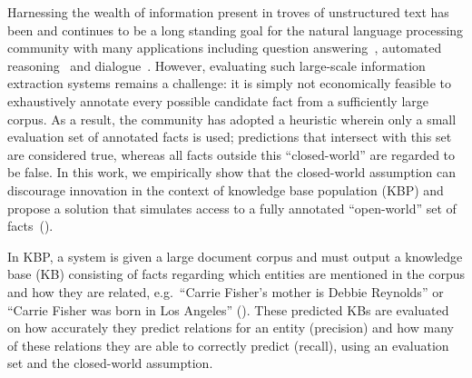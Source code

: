 Harnessing the wealth of information present in troves of unstructured text has been and continues to be a long standing goal for the natural language processing community with many applications including question answering~\citep{berant2013freebase, fader2014open}, automated reasoning~\citep{kalyanpur2012structured} and dialogue~\citep{lee2015conversational,han2015exploiting}.
%
However, evaluating such large-scale information extraction systems remains a challenge:
it is simply not economically feasible to exhaustively annotate every possible candidate fact from a sufficiently large corpus.
As a result, the community has adopted a heuristic wherein only a small evaluation set of annotated facts is used; predictions that intersect with this set are considered true, whereas all facts outside this ``closed-world'' are regarded to be false.
In this work, we empirically show that the closed-world assumption can discourage innovation in the context of knowledge base population (KBP) and propose a solution that simulates access to a fully annotated ``open-world'' set of facts~().

In KBP, a system is given a large document corpus and must output a knowledge base (KB) consisting of facts regarding which entities are mentioned in the corpus and how they are related, e.g.\ ``Carrie Fisher's mother is Debbie Reynolds'' or ``Carrie Fisher was born in Los Angeles'' (). %
These predicted KBs are evaluated on how accurately they predict relations for an entity (precision) and how many of these relations they are able to correctly predict (recall), using an evaluation set and the closed-world assumption. %

